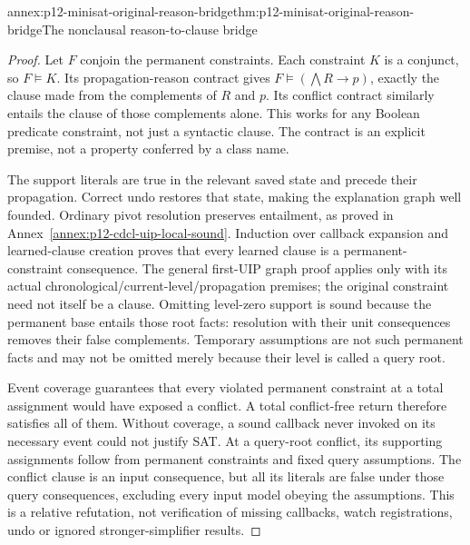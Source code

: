 \begin{annexitem}{annex:p12-minisat-original-reason-bridge}{thm:p12-minisat-original-reason-bridge}{The nonclausal reason-to-clause bridge}
\begin{proof}
Let \(F\) conjoin the permanent constraints.  Each constraint \(K\) is
a conjunct, so \(F\models K\).  Its propagation-reason contract gives
\(F\models(\bigwedge R\to p)\), exactly the clause made from the
complements of \(R\) and \(p\).  Its conflict contract similarly entails
the clause of those complements alone.  This works for any Boolean
predicate constraint, not just a syntactic clause.  The contract is an
explicit premise, not a property conferred by a class name.

The support literals are true in the relevant saved state and precede their
propagation.  Correct undo restores that state, making the explanation graph
well founded.  Ordinary pivot resolution preserves entailment, as proved in
Annex~\ref{annex:p12-cdcl-uip-local-sound}.  Induction over callback expansion
and learned-clause creation proves that every learned clause is a permanent-
constraint consequence.  The general first-UIP graph proof applies only
with its actual chronological/current-level/propagation premises; the original
constraint need not itself be a clause.  Omitting level-zero support is sound
because the permanent base entails those root facts: resolution with their
unit consequences removes their false complements.  Temporary assumptions
are not such permanent facts and may not be omitted merely because their
level is called a query root.

Event coverage guarantees that every violated permanent constraint at a
total assignment would have exposed a conflict.  A total conflict-free return
therefore satisfies all of them.  Without coverage, a sound callback never
invoked on its necessary event could not justify SAT.  At a query-root
conflict, its supporting assignments follow from permanent constraints and
fixed query assumptions.  The conflict clause is an input consequence, but
all its literals are false under those query consequences, excluding every
input model obeying the assumptions.  This is a relative refutation, not
verification of missing callbacks, watch registrations, undo or ignored
stronger-simplifier results.
\end{proof}
\end{annexitem}

